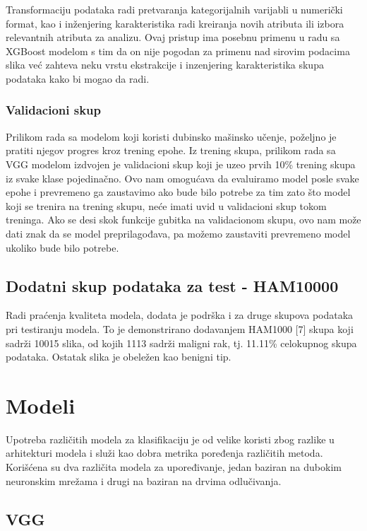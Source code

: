 \documentclass{article}
\begin{document}
\par
Transformaciju podataka radi pretvaranja kategorijalnih varijabli u numerički format, kao i inženjering karakteristika radi kreiranja novih atributa ili izbora relevantnih atributa za analizu. Ovaj pristup ima posebnu primenu u radu sa XGBoost modelom s tim da on nije pogodan za primenu nad sirovim podacima slika već zahteva neku vrstu ekstrakcije i inzenjering karakteristika skupa podataka kako bi mogao da radi.

\subsubsection{Validacioni skup}

Prilikom rada sa modelom koji koristi dubinsko mašinsko učenje, poželjno je pratiti njegov progres kroz trening epohe. Iz trening skupa, prilikom rada sa VGG modelom izdvojen je validacioni skup koji je uzeo prvih 10\% trening skupa iz svake klase pojedinačno. Ovo nam omogućava da evaluiramo model posle svake epohe i prevremeno ga zaustavimo ako bude bilo potrebe za tim zato što model koji se trenira na trening skupu, neće imati uvid u validacioni skup tokom treninga. Ako se desi skok funkcije gubitka na validacionom skupu, ovo nam može dati znak da se model preprilagođava, pa možemo zaustaviti prevremeno model ukoliko bude bilo potrebe.

\subsection{Dodatni skup podataka za test - HAM10000}

Radi praćenja kvaliteta modela, dodata je podrška i za druge skupova podataka pri testiranju modela. To je demonstrirano dodavanjem HAM1000 [7] skupa koji sadrži 10015 slika, od kojih 1113 sadrži maligni rak, tj. 11.11\% celokupnog skupa podataka. Ostatak slika je obeležen kao benigni tip.

\section{Modeli}

Upotreba različitih modela za klasifikaciju je od velike koristi zbog razlike u arhitekturi modela i služi kao dobra metrika poređenja različitih metoda. Korišćena su dva različita modela za upoređivanje, jedan baziran na dubokim neuronskim mrežama i drugi na baziran na drvima odlučivanja.

\subsection{VGG}
\end{document}
